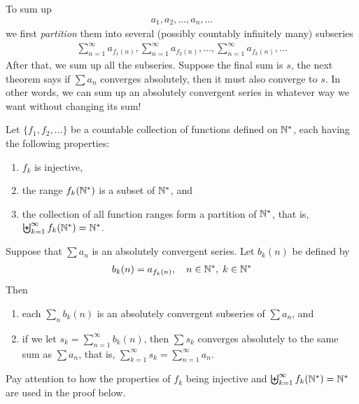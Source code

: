 \documentclass[thmcnt=section, 12pt]{my-elegantbook}
\begin{document}

To sum up
\begin{align*}
    a_1, a_2, \ldots, a_n, \ldots
\end{align*}
we first \textit{partition} them into several (possibly countably infinitely many) subseries
\begin{align*}
    \sum_{n=1}^\infty a_{f_1(n)}, \sum_{n=1}^\infty a_{f_2(n)}, \ldots, 
    \sum_{n=1}^\infty a_{f_k(n)}, \ldots
\end{align*}
After that, we sum up all the subseries. Suppose the final sum is $s$, the next theorem says if $\sum a_n$ converges absolutely, then it must also converge to $s$. In other words, we can sum up an absolutely convergent series in whatever way we want without changing its sum!

\begin{theorem} \label{thm:50}
    Let $\{f_1, f_2, \ldots\}$ be a countable collection of functions defined on $\mathbb{N}^\ast$, each having the following properties:
    \begin{enumerate}
        \item $f_k$ is injective,
        \item the range $f_k(\mathbb{N}^\ast)$ is a subset of $\mathbb{N}^\ast$, and
        \item the collection of all function ranges form a partition of $\mathbb{N}^\ast$, that is, $\biguplus_{k=1}^\infty f_k(\mathbb{N}^\ast) = \mathbb{N}^\ast$.
    \end{enumerate}
    Suppose that $\sum a_n$ is an absolutely convergent series. Let $b_k(n)$ be defined by 
    \begin{align*}
        b_k(n) = a_{f_k(n)},
        \quad
        n \in \mathbb{N}^\ast, \;
        k \in \mathbb{N}^\ast
    \end{align*}
    Then
    \begin{enumerate}
        \item each $\sum_n b_k(n)$ is an absolutely convergent subseries of $\sum a_n$, and 
        \item if we let $s_k = \sum_{n=1}^\infty b_k(n)$, then $\sum s_k$ converges absolutely to the same sum as $\sum a_n$, that is, $\sum_{k=1}^\infty s_k = \sum_{n=1}^\infty a_n$.
    \end{enumerate}
\end{theorem}

\begin{note}
    Pay attention to how the properties of $f_k$ being injective and $\biguplus_{k=1}^\infty f_k(\mathbb{N}^\ast)= \mathbb{N}^\ast$ are used in the proof below.
\end{note}
\end{document}
